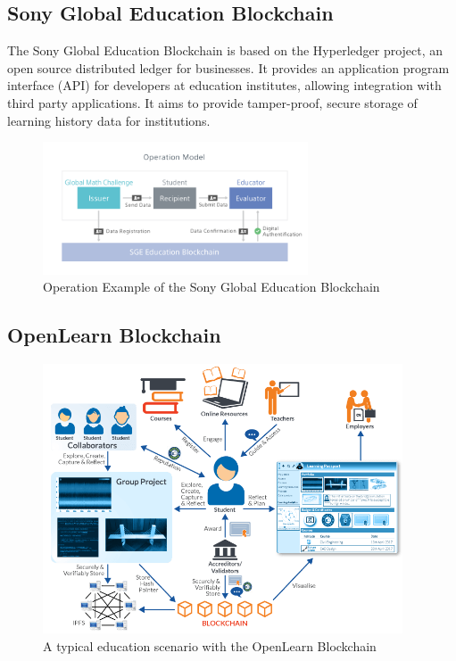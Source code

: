 \subsection{Sony Global Education Blockchain}%

The Sony Global Education Blockchain is based on the Hyperledger project, an open source distributed ledger 
for businesses. It provides an application program interface (API) for developers at education institutes, 
allowing integration with third party applications. It aims to provide tamper-proof, secure storage of 
learning history data for institutions. \citep{sonyged2017}

\begin{figure}[!h] 
    \centering    
    \includegraphics[width=0.7\textwidth]{sonyged}
    \caption[Sony Global Education Blockchain]
        {Operation Example of the Sony Global Education Blockchain \citep{sonyged2017}}
    \label{fig:sonyged}
\end{figure}

\subsection{OpenLearn Blockchain}%

\begin{figure}[!h] 
    \centering    
    \includegraphics[width=0.95\textwidth]{openlearn}
    \caption[OpenLearn Blockchain scenario]
        {A typical education scenario with the OpenLearn Blockchain\citep{openlearn2018}}
    \label{fig:openlearn}
\end{figure}

